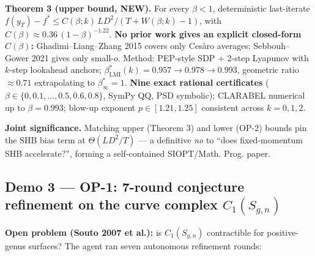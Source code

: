 \documentclass[
  10.5pt,
]{article}
\begin{document}
\textbf{Theorem 3 (upper bound, NEW).} For every \(\beta<1\),
deterministic last-iterate
\(f(y_T)-f^* \le C(\beta;k)\,LD^2/(T+W(\beta;k)-1)\), with
\(C(\beta) \approx 0.36\,(1-\beta)^{-1.22}\). \textbf{No prior work
gives an explicit closed-form \(C(\beta)\):} Ghadimi--Liang--Zhang 2015
covers only Cesàro averages; Sebbouh--Gower 2021 gives only small-\(o\).
Method: PEP-style SDP + 2-step Lyapunov with \(k\)-step lookahead
anchors; \(\beta^*_{\text{LMI}}(k){=}0.957\!\to\!0.978\!\to\!0.993\),
geometric ratio \(\approx 0.71\) extrapolating to \(\beta^*_\infty=1\).
\textbf{Nine exact rational certificates}
(\(\beta\in\{0,0.1,\ldots,0.5,0.6,0.8\}\), SymPy QQ, PSD symbolic);
CLARABEL numerical up to \(\beta=0.993\); blow-up exponent
\(p\!\in\![1.21,1.25]\) consistent across \(k=0,1,2\).

\textbf{Joint significance.} Matching upper (Theorem 3) and lower (OP-2)
bounds pin the SHB bias term at \(\Theta(LD^2/T)\) --- a definitive
\emph{no} to ``does fixed-momentum SHB accelerate?'', forming a
self-contained SIOPT/Math. Prog. paper.

\subsection{\texorpdfstring{Demo 3 --- OP-1: 7-round conjecture
refinement on the curve complex
\(C_1(S_{g,n})\)}{Demo 3 --- OP-1: 7-round conjecture refinement on the curve complex C\_1(S\_\{g,n\})}}\label{demo-3-op-1-7-round-conjecture-refinement-on-the-curve-complex-c_1s_gn}

\textbf{Open problem (Souto 2007 et al.):} is \(C_1(S_{g,n})\)
contractible for positive-genus surfaces? The agent ran seven autonomous
refinement rounds:
\end{document}
